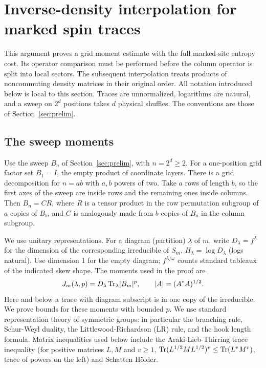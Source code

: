 \section{Inverse-density interpolation for marked spin traces}
\label{ten:inverse}
This argument proves a grid moment estimate with the full marked-site entropy cost. Its operator comparison must be performed before the column operator is split into local sectors. The subsequent interpolation treats products of noncommuting density matrices in their original order.
\smallskip
All notation introduced below is local to this section. Traces are unnormalized, logarithms are natural, and a sweep on $2^d$ positions takes $d$ physical shuffles. The conventions are those of Section~\ref{sec:prelim}.

\subsection{The sweep moments}
Use the sweep $B_n$ of Section~\ref{sec:prelim}, with \(n=2^d\ge2\).
For a one-position grid factor set \(B_1=I\), the empty product of
coordinate layers. There is a grid decomposition for \(n=ab\) with
\(a,b\) powers of two. Take \(a\) rows of length \(b\), so the first axes
of the sweep are inside rows and the remaining ones inside columns. Then
\(B_n=C R\), where \(R\) is a tensor product in the row permutation
subgroup of \(a\) copies of \(B_b\), and \(C\) is analogously made from
\(b\) copies of \(B_a\) in the column subgroup.

We use unitary representations. For a diagram (partition) \(\lambda\) of \(m\), write \(D_\lambda=f^\lambda\) for the dimension of the corresponding irreducible of \(S_m\), \(H_\lambda=\log D_\lambda\) (logs natural). Use dimension 1 for the empty diagram; \(f^{\lambda/\omega}\) counts standard tableaux of the indicated skew shape. The moments used in the proof are
\[
 J_m(\lambda,p)=D_\lambda\,{\rm Tr}_\lambda |B_m|^p,\qquad |A|=(A^*A)^{1/2}.
\]
Here and below a trace with diagram subscript is in one copy of the irreducible. We prove bounds for these moments with bounded \(p\). We use standard representation theory of symmetric groups: in particular the branching rule, Schur-Weyl duality, the Littlewood-Richardson (LR) rule, and the hook length formula. Matrix inequalities used below include the Araki-Lieb-Thirring trace inequality (for positive matrices \(L,M\) and \(v\ge1\), \({\rm Tr}(L^{1/2}M L^{1/2})^v\le {\rm Tr}(L^v M^v)\), trace of powers on the left) and Schatten H\"older.

